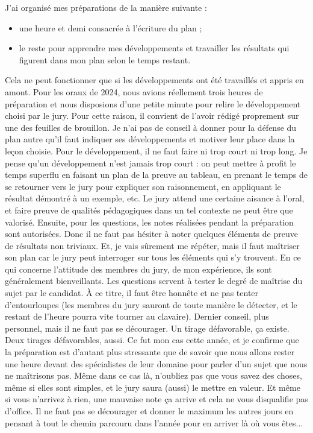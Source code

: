   J'ai organisé mes préparations de la manière suivante :
  \begin{itemize}
    \item une heure et demi consacrée à l'écriture du plan ;
    \item le reste pour apprendre mes développements et travailler les résultats qui figurent dans mon plan selon le temps restant.
  \end{itemize}
  Cela ne peut fonctionner que si les développements ont été travaillés et appris en amont. Pour les oraux de 2024, nous avions réellement trois heures de préparation et nous disposions d'une petite minute pour relire le développement choisi par le jury. Pour cette raison, il convient de l'avoir rédigé proprement sur une des feuilles de brouillon.
  \newpar
  Je n'ai pas de conseil à donner pour la défense du plan autre qu'il faut indiquer ses développements et motiver leur place dans la leçon choisie.
  \newpar
  Pour le développement, il ne faut faire ni trop court ni trop long. Je pense qu'un développement n'est jamais trop court : on peut mettre à profit le temps superflu en faisant un plan de la preuve au tableau, en prenant le temps de se retourner vers le jury pour expliquer son raisonnement, en appliquant le résultat démontré à un exemple, etc. Le jury attend une certaine aisance à l'oral, et faire preuve de qualités pédagogiques dans un tel contexte ne peut être que valorisé.
  \newpar
  Ensuite, pour les questions, les notes réalisées pendant la préparation sont autorisées. Donc il ne faut pas hésiter à noter quelques éléments de preuve de résultats non triviaux. Et, je vais sûrement me répéter, mais il faut maîtriser son plan car le jury peut interroger sur tous les éléments qui s'y trouvent.
  \newpar
  En ce qui concerne l'attitude des membres du jury, de mon expérience, ils sont généralement bienveillants. Les questions servent à tester le degré de maîtrise du sujet par le candidat. À ce titre, il faut être honnête et ne pas tenter d'entourloupes (les membres du jury sauront de toute manière le détecter, et le restant de l'heure pourra vite tourner au clavaire).
  \newpar
  Dernier conseil, plus personnel, mais il ne faut pas se décourager. Un tirage défavorable, ça existe. Deux tirages défavorables, aussi. Ce fut mon cas cette année, et je confirme que la préparation est d'autant plus stressante que de savoir que nous allons rester une heure devant des spécialistes de leur domaine pour parler d'un sujet que nous ne maîtrisons pas. Même dans ce cas là, n'oubliez pas que vous savez des choses, même si elles sont simples, et le jury saura (aussi) le mettre en valeur. Et même si vous n'arrivez à rien, une mauvaise note ça arrive et cela ne vous disqualifie pas d'office. Il ne faut pas se décourager et donner le maximum les autres jours en pensant à tout le chemin parcouru dans l'année pour en arriver là où vous êtes...

